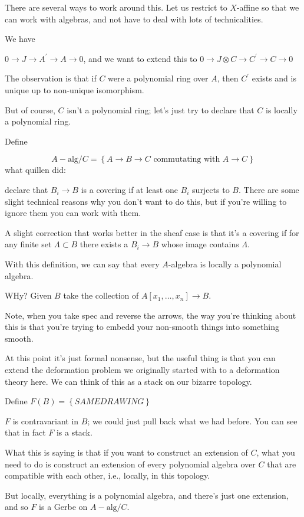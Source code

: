 \documentclass{amsart}
\theoremstyle{definition}
\newcommand{\alg}{\text{alg}}
\begin{document}
There are several ways to work around this.  Let us restrict to $X$-affine so that we can work with algebras, and not have to deal with lots of technicalities.

We have

$0\to J\to A^\prime\to A\to 0$, and we want to extend this to 
$0\to J\otimes C\to C^\prime\to C\to 0$

The observation is that if $C$ were a polynomial ring over $A$, then $C^\prime$ exists and is unique up to non-unique isomorphism.  

But of course, $C$ isn't a polynomial ring; let's just try to declare that $C$ is locally a polynomial ring.

Define

$$A-\text{alg}/C=\left\{A\to B\to C \text{ commutating with } A\to C\right\}$$
what quillen did:

declare that $B_i\to B$ is a covering if at least one $B_i$ surjects to $B$.  There are some slight technical reasons why you don't want to do this, but if you're willing to ignore them you can work with them.

A slight correction that works better in the sheaf case is that it's a covering if for any finite set $\Lambda\subset B$ there exists a $B_i\to B$ whose image contains $\Lambda$.

With this definition, we can say that every $A$-algebra is locally a polynomial algebra.

WHy?  Given $B$ take the collection of $A[x_1,\dots, x_n]\to B$.

Note, when you take spec and reverse the arrows, the way you're thinking about this is that you're trying to embedd your non-smooth things into something smooth.  

At this point it's just formal nonsense, but the useful thing is that you can extend the deformation problem we originally started with to a deformation theory here.  We can think of this as a stack on our bizarre topology.

Define $F(B)=\left\{SAME DRAWING \right\}$

$F$ is contravariant in $B$; we could just pull back what we had before.
You can see that in fact $F$ is a stack.

What this is saying is that if you want to construct an extension of $C$, what you need to do is construct an extension of every polynomial algebra over $C$ that are compatible with each other, i.e., locally, in this topology.

But locally, everything is a polynomial algebra, and there's just one extension, and so $F$ is a Gerbe on $A-\alg/C$.
\end{document}
